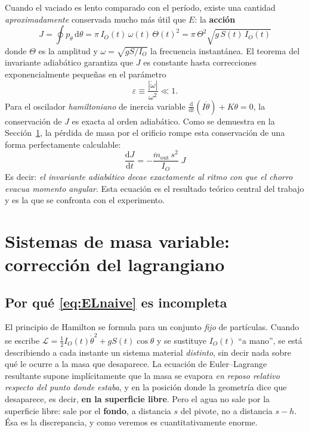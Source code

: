 \documentclass[11pt,a4paper]{article}
\newcommand{\dd}{\mathrm{d}}
\newcommand{\eps}{\varepsilon}
\begin{document}
Cuando el vaciado es lento comparado con el período, existe una cantidad
\emph{aproximadamente} conservada mucho más útil que $E$: la \textbf{acción}
\begin{equation}
\boxed{\;
J = \oint p_\theta\,\dd\theta = \pi\, I_O(t)\,\omega(t)\,\Theta(t)^2
  = \pi\,\Theta^2\sqrt{g\,S(t)\,I_O(t)} \;}
\label{eq:accion}
\end{equation}
donde $\Theta$ es la amplitud y $\omega=\sqrt{gS/I_O}$ la frecuencia instantánea.
El teorema del invariante adiabático garantiza que $J$ es constante hasta correcciones
exponencialmente pequeñas en el parámetro
\begin{equation}
\eps \equiv \frac{|\dot\omega|}{\omega^2} \ll 1 .
\label{eq:epsilon}
\end{equation}
Para el oscilador \emph{hamiltoniano} de inercia variable
$\frac{\dd}{\dd t}(I\dot\theta)+K\theta=0$, la conservación de $J$ es exacta al orden adiabático.
Como se demuestra en la Sección~\ref{sec:masavar}, la pérdida de masa por el orificio rompe esta
conservación de una forma perfectamente calculable:
\begin{equation}
\boxed{\;\frac{\dd J}{\dd t} = -\frac{\dot m_{\text{out}}\,s^2}{I_O}\;J \;}
\label{eq:dJdt}
\end{equation}
Es decir: \emph{el invariante adiabático decae exactamente al ritmo con que el chorro evacua
momento angular}. Esta ecuación es el resultado teórico central del trabajo y es la que se
confronta con el experimento.

\section{Sistemas de masa variable: corrección del lagrangiano}
\label{sec:masavar}

\subsection{Por qué \eqref{eq:ELnaive} es incompleta}

El principio de Hamilton se formula para un conjunto \emph{fijo} de partículas. Cuando se escribe
$\mathcal L = \tfrac12 I_O(t)\dot\theta^2 + gS(t)\cos\theta$ y se sustituye $I_O(t)$ ``a mano'',
se está describiendo a cada instante un sistema material \emph{distinto}, sin decir nada sobre
qué le ocurre a la masa que desaparece. La ecuación de Euler--Lagrange resultante supone
implícitamente que la masa se evapora \emph{en reposo relativo respecto del punto donde estaba}, y
en la posición donde la geometría dice que desaparece, es decir, \textbf{en la superficie libre}.
Pero el agua no sale por la superficie libre: sale por el \textbf{fondo}, a distancia $s$ del
pivote, no a distancia $s-h$. Ésa es la discrepancia, y como veremos es cuantitativamente enorme.
\end{document}
